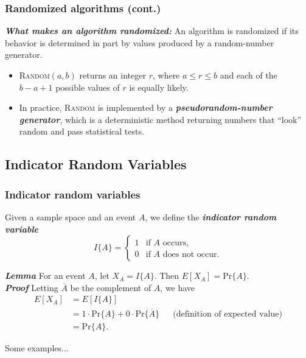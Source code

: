 \documentclass[notes,serif]{beamer}
\begin{document}
\begin{frame}
\frametitle{Randomized algorithms (cont.)}
  \begin{block}{{\bf \em What makes an algorithm randomized:}}
  An algorithm is randomized if its behavior is determined in part by values produced by a random-number generator.
  \begin{itemize}
    \item \textsc{Random}$(a, b)$ returns an integer $r$, where $a \le r \le b$ and each of the $b-a+1$ possible values of $r$ is equally likely.
    \item In practice, \textsc{{R}andom} is implemented by a {\bf \em pseudorandom-number generator}, which is a deterministic method returning numbers that {\color{blue}``look''} random and pass statistical tests.
  \end{itemize}
  \end{block}
\end{frame}

\subsection{Indicator Random Variables}
\begin{frame}
\frametitle{Indicator random variables}
Given a sample space and an event $A$, we define the {\bf \em indicator random variable}
$$
I\{A\}=
\begin{cases}
1 & \text{if $A$ occurs,} \\
0 & \text{if $A$ does not occur.}
\end{cases}
$$
  \begin{block}{\bf \em Lemma}
    For an event $A$, let $X_A = I\{A\}$. Then $E[X_A] = \text{Pr}\{A\}$. \\
    {\bf \em Proof} Letting $\overline{A}$ be the complement of $A$, we have
    \begin{align*}
      E[X_A] &= E[I\{A\}] \\
                   &= 1 \cdot \text{Pr} \{A\} + 0 \cdot \text{Pr} \{\overline{A}\}  & & \text{(definition of expected value)} \\
                   &= \text{Pr} \{A\}.
    \end{align*}
  \end{block}
Some examples...
\end{frame}
\end{document}
